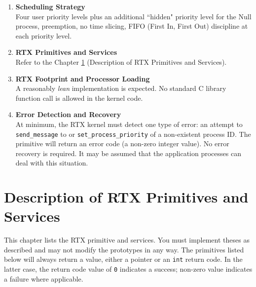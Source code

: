 \begin{enumerate}
\item {\bf Scheduling Strategy}\\
      Four user priority levels plus an additional ``hidden" priority level for the Null process, preemption, no time slicing, FIFO (First In, First Out) discipline at each priority level.
\item {\bf RTX Primitives and Services}\\
      Refer to the Chapter \ref{p01_ch_rtx_api} (Description of RTX Primitives and Services).
\item {\bf RTX Footprint and Processor Loading} \\
      A reasonably {\em lean} implementation is expected. No standard C library function call is allowed in the kernel code.
\item {\bf Error Detection and Recovery}\\
      At minimum, the RTX kernel must detect one type of error: an attempt to \verb+send_message+ to or 
      \verb+set_process_priority+ of a non-existent process ID. The primitive will return an error code 
      (a non-zero integer value). No error recovery is required. 
      It may be assumed that the application processes can deal with this situation.
\end{enumerate}

\chapter{Description of RTX Primitives and Services}
\label{p01_ch_rtx_api}
This chapter lists the RTX primitive and services. You must implement theses as described and may not modify the prototypes in any way. The primitives listed below will always return a value, either a pointer or an \verb+int+ return code. In the latter case, the return code value of \verb+0+ indicates a success; non-zero value indicates a failure where applicable.

